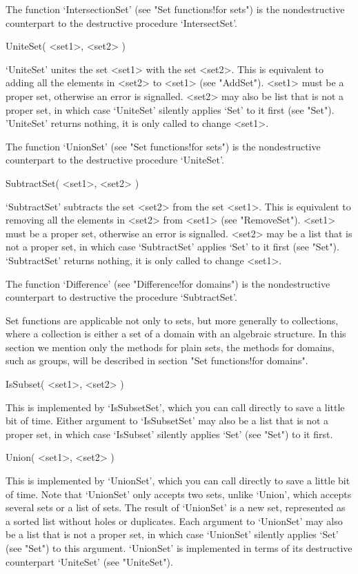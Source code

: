 The function `IntersectionSet'  (see  "Set functions!for sets")  is  the
nondestructive counterpart to the destructive procedure `IntersectSet'.

\>UniteSet( <set1>, <set2> )

`UniteSet' unites the set <set1> with the set <set2>.  This is equivalent
to adding all the elements  in <set2>  to <set1> (see "AddSet").   <set1>
must be a proper set, otherwise an  error is  signalled.  <set2> may also
be  list that  is  not a  proper set,  in  which case `UniteSet' silently
applies `Set' to it first (see "Set").  'UniteSet' returns nothing, it is
only called to change <set1>.

The  function   `UnionSet'   (see  "Set   functions!for sets")  is    the
nondestructive counterpart to the destructive procedure `UniteSet'.

\>SubtractSet( <set1>, <set2> )

`SubtractSet'  subtracts  the set  <set2>  from the set  <set1>.  This is
equivalent to  removing  all the elements in   <set2>  from  <set1>  (see
"RemoveSet").   <set1> must  be  a  proper  set, otherwise   an  error is
signalled.  <set2> may be a list that is not a proper  set, in which case
`SubtractSet' applies  `Set'   to it   first  (see "Set").  `SubtractSet'
returns nothing, it is only called to change <set1>.

The   function `Difference'    (see   "Difference!for  domains") is   the
nondestructive counterpart to destructive the procedure `SubtractSet'.


Set  functions  are applicable not  only  to sets,  but more generally to
collections, where a  collection  is either a  set of  a  domain  with an
algebraic  structure.  In this  section we mention  only the  methods for
plain sets, the methods for domains, such as groups, will be described in
section "Set functions!for domains".

\>IsSubset( <set1>, <set2> )

This is implemented by `IsSubsetSet', which you can call directly to save
a little  bit of  time.  Either argument to  `IsSubsetSet' may also  be a
list that is not a proper set, in which  case `IsSubset' silently applies
`Set' (see "Set") to it first.

\>Union( <set1>, <set2> )

This is implemented by `UnionSet', which you can call  directly to save a
little bit of time.  Note that  `UnionSet' only accepts two  sets, unlike
`Union',  which accepts several sets or  a list of  sets.  The  result of
`UnionSet' is a new set,  represented as  a sorted list  without holes or
duplicates.  Each argument to `UnionSet' may also be a list that is not a
proper set, in which case `UnionSet'  silently  applies `Set' (see "Set")
to this argument.  `UnionSet' is implemented in terms of its  destructive
counterpart `UniteSet' (see "UniteSet").

